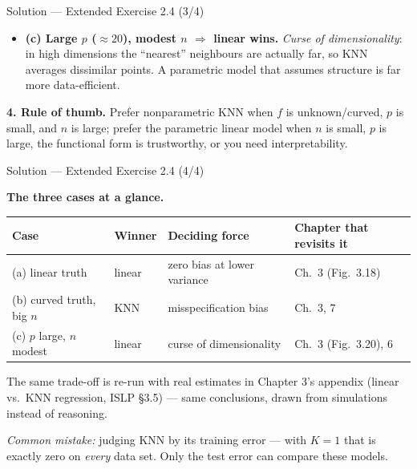 \documentclass[aspectratio=169,11pt]{beamer}
\begin{document}
\begin{frame}{Solution --- Extended Exercise 2.4 (3/4)}
\begin{solutionbox}
  \begin{itemize}
  \item \textbf{(c) Large $p$ ($\approx20$), modest $n$ $\Rightarrow$ linear wins.} \emph{Curse of dimensionality}: in high dimensions the ``nearest'' neighbours are actually far, so KNN averages dissimilar points. A parametric model that assumes structure is far more data-efficient.
\end{itemize}
\textbf{4. Rule of thumb.} Prefer nonparametric KNN when $f$ is unknown/curved, $p$ is small, and $n$ is large; prefer the parametric linear model when $n$ is small, $p$ is large, the functional form is trustworthy, or you need interpretability.
\end{solutionbox}
\end{frame}

\begin{frame}{Solution --- Extended Exercise 2.4 (4/4)}
\begin{solutionbox}
\textbf{The three cases at a glance.}
\begin{center}\footnotesize
\begin{tabular}{llll}
\toprule
Case & Winner & Deciding force & Chapter that revisits it \\
\midrule
(a) linear truth & linear & zero bias at lower variance & Ch.\ 3 (Fig.\ 3.18) \\
(b) curved truth, big $n$ & KNN & misspecification bias & Ch.\ 3, 7 \\
(c) $p$ large, $n$ modest & linear & curse of dimensionality & Ch.\ 3 (Fig.\ 3.20), 6 \\
\bottomrule
\end{tabular}
\end{center}
The same trade-off is re-run with real estimates in Chapter 3's appendix
(linear vs.\ KNN regression, ISLP \S3.5) --- same conclusions, drawn from
simulations instead of reasoning.

\smallskip
\textit{Common mistake:} judging KNN by its training error --- with $K=1$ that is exactly zero on \emph{every} data set. Only the test error can compare these models.
\end{solutionbox}
\end{frame}
\end{document}
